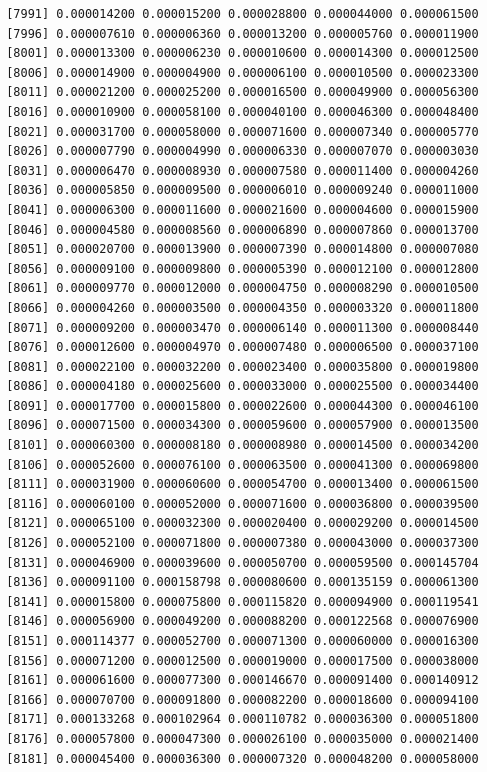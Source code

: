 \documentclass[]{article}
\begin{document}
\begin{verbatim}
 [7991] 0.000014200 0.000015200 0.000028800 0.000044000 0.000061500
 [7996] 0.000007610 0.000006360 0.000013200 0.000005760 0.000011900
 [8001] 0.000013300 0.000006230 0.000010600 0.000014300 0.000012500
 [8006] 0.000014900 0.000004900 0.000006100 0.000010500 0.000023300
 [8011] 0.000021200 0.000025200 0.000016500 0.000049900 0.000056300
 [8016] 0.000010900 0.000058100 0.000040100 0.000046300 0.000048400
 [8021] 0.000031700 0.000058000 0.000071600 0.000007340 0.000005770
 [8026] 0.000007790 0.000004990 0.000006330 0.000007070 0.000003030
 [8031] 0.000006470 0.000008930 0.000007580 0.000011400 0.000004260
 [8036] 0.000005850 0.000009500 0.000006010 0.000009240 0.000011000
 [8041] 0.000006300 0.000011600 0.000021600 0.000004600 0.000015900
 [8046] 0.000004580 0.000008560 0.000006890 0.000007860 0.000013700
 [8051] 0.000020700 0.000013900 0.000007390 0.000014800 0.000007080
 [8056] 0.000009100 0.000009800 0.000005390 0.000012100 0.000012800
 [8061] 0.000009770 0.000012000 0.000004750 0.000008290 0.000010500
 [8066] 0.000004260 0.000003500 0.000004350 0.000003320 0.000011800
 [8071] 0.000009200 0.000003470 0.000006140 0.000011300 0.000008440
 [8076] 0.000012600 0.000004970 0.000007480 0.000006500 0.000037100
 [8081] 0.000022100 0.000032200 0.000023400 0.000035800 0.000019800
 [8086] 0.000004180 0.000025600 0.000033000 0.000025500 0.000034400
 [8091] 0.000017700 0.000015800 0.000022600 0.000044300 0.000046100
 [8096] 0.000071500 0.000034300 0.000059600 0.000057900 0.000013500
 [8101] 0.000060300 0.000008180 0.000008980 0.000014500 0.000034200
 [8106] 0.000052600 0.000076100 0.000063500 0.000041300 0.000069800
 [8111] 0.000031900 0.000060600 0.000054700 0.000013400 0.000061500
 [8116] 0.000060100 0.000052000 0.000071600 0.000036800 0.000039500
 [8121] 0.000065100 0.000032300 0.000020400 0.000029200 0.000014500
 [8126] 0.000052100 0.000071800 0.000007380 0.000043000 0.000037300
 [8131] 0.000046900 0.000039600 0.000050700 0.000059500 0.000145704
 [8136] 0.000091100 0.000158798 0.000080600 0.000135159 0.000061300
 [8141] 0.000015800 0.000075800 0.000115820 0.000094900 0.000119541
 [8146] 0.000056900 0.000049200 0.000088200 0.000122568 0.000076900
 [8151] 0.000114377 0.000052700 0.000071300 0.000060000 0.000016300
 [8156] 0.000071200 0.000012500 0.000019000 0.000017500 0.000038000
 [8161] 0.000061600 0.000077300 0.000146670 0.000091400 0.000140912
 [8166] 0.000070700 0.000091800 0.000082200 0.000018600 0.000094100
 [8171] 0.000133268 0.000102964 0.000110782 0.000036300 0.000051800
 [8176] 0.000057800 0.000047300 0.000026100 0.000035000 0.000021400
 [8181] 0.000045400 0.000036300 0.000007320 0.000048200 0.000058000

\end{verbatim}
\end{document}
